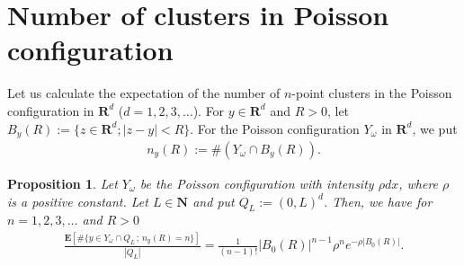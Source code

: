 \documentclass[12pt,a4paper]{article}
\newtheorem{proposition}[theorem]{Proposition}
\begin{document}
\section{Number of clusters in Poisson configuration}
Let us calculate the expectation of the number of $n$-point clusters in the 
Poisson configuration in $\mathbf{R}^d$
($d=1,2,3,\ldots$).
For $y\in \mathbf{R}^d$ and $R>0$,
let $B_y(R):=\{z\in \mathbf{R}^d ; |z-y|<R\}$.
For the Poisson configuration $Y_\omega$ in $\mathbf{R}^d$,
we put
\begin{align}
\label{03_01}
n_y(R) :=\#(Y_\omega \cap B_y(R)).
\end{align}
\begin{proposition}
\label{prop_cluster}
Let $Y_\omega$ be the Poisson configuration 
with intensity $\rho dx$, where $\rho$ is a positive constant.
Let $L\in\mathbf{N}$ and put $Q_L:=(0,L)^d$.
Then, we have for $n=1,2,3,\ldots$ and $R>0$
\begin{align}
\label{03_02}
 \frac{\mathbf{E}[
\#\{y\in Y_\omega \cap Q_L
\,;\, n_y(R)=n
\}
]}
{|Q_L|}
=
\frac{1}{(n-1)!}|B_0(R)|^{n-1}\rho^n e^{-\rho|B_0(R)|}.
\end{align}
\end{proposition}
\end{document}
